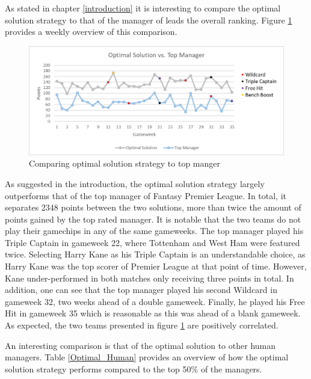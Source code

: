 \newpar

As stated in chapter \ref{introduction} it is interesting to compare the optimal solution strategy to that of the manager of leads the overall ranking. Figure \ref{Top_Manager} provides a weekly overview of this comparison.

\begin{figure}[H]
\label{fig:Top_Manager}
    \centering
    \includegraphics[scale=0.75]{fig/chapter_7/Optimal_vs_Top_colour.png}
    \caption{Comparing optimal solution strategy to top manger}
\label{Top_Manager}    
\end{figure}

As suggested in the introduction, the optimal solution strategy largely outperforms that of the top manager of Fantasy Premier League. In total, it separates 2348 points between the two solutions, more than twice the amount of points gained by the top rated manager. It is notable that the two teams do not play their gamechips in any of the same gameweeks. The top manager played his Triple Captain in gameweek 22, where Tottenham and West Ham were featured twice. Selecting Harry Kane as his Triple Captain is an understandable choice, as Harry Kane was the top scorer of Premier League at that point of time. However, Kane under-performed in both matches only receiving three points in total. In addition, one can see that the top manager played his second Wildcard in gameweek 32, two weeks ahead of a double gameweek. Finally, he played his Free Hit in gameweek 35 which is reasonable as this was ahead of a blank gameweek. As expected, the two teams presented in figure \ref{Top_Manager} are positively correlated.   

\newpar

An interesting comparison is that of the optimal solution to other human managers. Table \ref{Optimal_Human} provides an overview of how the optimal solution strategy performs compared to the top 50\% of the managers. 

